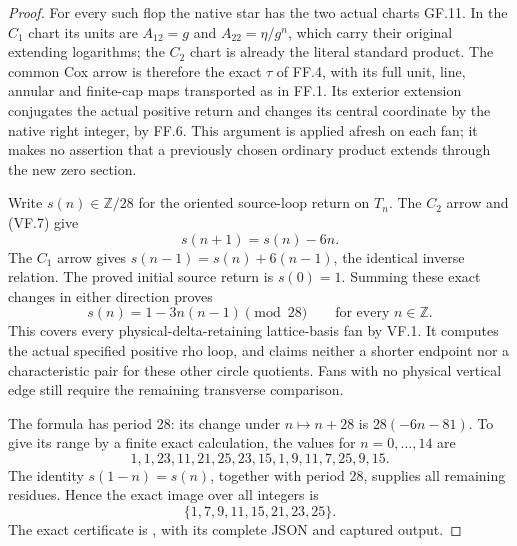 \begin{proof}
For every such flop the native star has the two actual charts
GF.11. In the \(C_1\) chart its units are \(A_{12}=g\) and
\(A_{22}=\eta/g^n\), which carry their original extending logarithms;
the \(C_2\) chart is already the literal standard product. The
common Cox arrow is therefore the exact \(\tau\) of FF.4, with
its full unit, line, annular and finite-cap maps transported as in
FF.1. Its exterior extension conjugates the actual positive return
and changes its central coordinate by the native right integer,
by FF.6. This argument is applied afresh on each fan; it makes no
assertion that a previously chosen ordinary product extends through
the new zero section.

Write \(s(n)\in\mathbb Z/28\) for the oriented source-loop return
on \(T_n\). The \(C_2\) arrow and (VF.7) give
\[
                     s(n+1)=s(n)-6n.                 \tag{VF.9}
\]
The \(C_1\) arrow gives \(s(n-1)=s(n)+6(n-1)\), the identical
inverse relation. The proved initial source return is \(s(0)=1\).
Summing these exact changes in either direction proves
\[
                    s(n)=1-3n(n-1)\pmod{28}
                    \qquad\text{for every }n\in\mathbb Z.
                                                               \tag{VF.10}
\]
This covers every physical-delta-retaining lattice-basis fan by
VF.1. It computes the actual specified positive rho loop, and
claims neither a shorter endpoint nor a characteristic pair for
these other circle quotients. Fans with no physical vertical edge
still require the remaining transverse comparison.

The formula has period 28: its change under \(n\mapsto n+28\) is
\(28(-6n-81)\). To give its range by a finite exact calculation,
the values for \(n=0,\ldots,14\) are
\[
 1,1,23,11,21,25,23,15,1,9,11,7,25,9,15.
\]
The identity \(s(1-n)=s(n)\), together with period 28, supplies
all remaining residues. Hence the exact image over all integers is
\[
                  \{1,7,9,11,15,21,23,25\}.
\]
The exact certificate is ,
with its complete JSON and captured output.
\end{proof}
